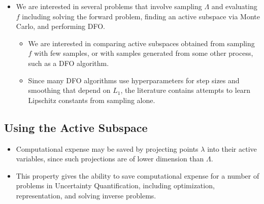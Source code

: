 \documentclass[11pt]{beamer}
\begin{document}
\begin{frame}

\begin{itemize}

	\item We are interested in several problems that involve sampling $\Lambda$ and evaluating $f$ including solving the forward problem, finding an active subspace via Monte Carlo, and performing DFO.
	
	\begin{itemize}
	
		\item We are interested in comparing active subspaces obtained from sampling $f$ with few samples, or with samples generated from some other process, such as a DFO algorithm.
		
		\item 	Since many DFO algorithms use hyperparameters for step sizes and smoothing that depend on $L_1$, the literature \footnotemark[1] \footnotemark[2] contains attempts to learn Lipschitz constants from sampling alone.
	
	\end{itemize}


\end{itemize}


\end{frame}


\subsection{Using the Active Subspace}

\begin{frame}

\begin{itemize}

	\item Computational expense may be saved by projecting points $\lambda$ into their active variables, since such projections are of lower dimension than $\Lambda$. 
	
	\item This property gives the ability to save computational expense for a number of problems in Uncertainty Quantification, including optimization, representation, and solving inverse problems.

\end{itemize}

\end{frame}
\end{document}
